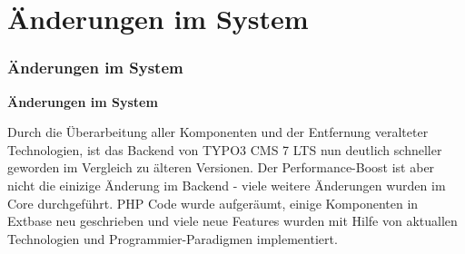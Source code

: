 %

\section{Änderungen im System}
\begin{frame}[fragile]
	\frametitle{Änderungen im System}

	\begin{center}\huge{\color{typo3darkgrey}\textbf{Änderungen im System}}\end{center}

	Durch die Überarbeitung aller Komponenten und der Entfernung veralteter Technologien,
	ist das Backend von TYPO3 CMS 7 LTS nun deutlich schneller geworden im Vergleich zu
	älteren Versionen.\newline
	Der Performance-Boost ist aber nicht die einizige Änderung im Backend - viele weitere
	Änderungen wurden im Core durchgeführt. PHP Code wurde aufgeräumt, einige Komponenten
	in Extbase neu geschrieben und viele neue Features wurden mit Hilfe von aktuallen
	Technologien und Programmier-Paradigmen implementiert.

\end{frame}

